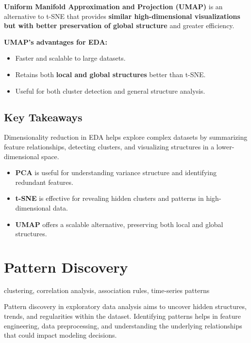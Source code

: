 \documentclass[12pt,openany, draft]{book}
\begin{document}
\textbf{Uniform Manifold Approximation and Projection (UMAP)} is an alternative to t-SNE that provides \textbf{similar high-dimensional visualizations but with better preservation of global structure} and greater efficiency.

\textbf{UMAP’s advantages for EDA:}
\begin{itemize}
    \item Faster and scalable to large datasets.
    \item Retains both \textbf{local and global structures} better than t-SNE.
    \item Useful for both cluster detection and general structure analysis.
\end{itemize}

\subsection{Key Takeaways}

Dimensionality reduction in EDA helps explore complex datasets by summarizing feature relationships, detecting clusters, and visualizing structures in a lower-dimensional space.

\begin{itemize}
    \item \textbf{PCA} is useful for understanding variance structure and identifying redundant features.
    \item \textbf{t-SNE} is effective for revealing hidden clusters and patterns in high-dimensional data.
    \item \textbf{UMAP} offers a scalable alternative, preserving both local and global structures.
\end{itemize}




\section{Pattern Discovery}

\begin{keywordsbox}
clustering, correlation analysis, association rules, time-series patterns
\end{keywordsbox}

Pattern discovery in exploratory data analysis aims to uncover hidden structures, trends, and regularities within the dataset. Identifying patterns helps in feature engineering, data preprocessing, and understanding the underlying relationships that could impact modeling decisions.
\end{document}

